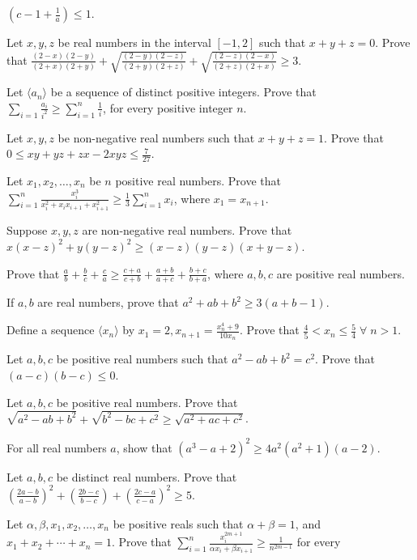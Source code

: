   $\left(c - 1 + \frac{1}{a}\right)\leq 1$.
\item Let $x, y, z$ be real numbers in the interval $[-1, 2]$ such that $x + y + z = 0$. Prove that $\frac{(2 - x)(2 - y)}{(2 +
  x)(2 + y)} + \sqrt{\frac{(2 - y)(2 - z)}{(2 + y)(2 + z)}} + \sqrt{\frac{(2 - z)(2 - x)}{(2 + z)(2 + x)}}\geq 3$.
\item Let $\langle a_n\rangle$ be a sequence of distinct positive integers. Prove that $\displaystyle\sum_{i=1}\frac{a_i}{i^2}\geq
  \sum_{i = 1}^n\frac{1}{i}$, for every positive integer $n$.
\item Let $x, y, z$ be non-negative real numbers such that $x + y + z = 1$. Prove that $0\leq xy + yz + zx - 2xyz\leq
  \frac{7}{27}$.
\item Let $x_1, x_2, \ldots, x_n$ be $n$ positive real numbers. Prove that $\displaystyle\sum_{i=1}^n\frac{x_i^3}{x_i^2 + x_ix_{i +
    1} + x_{i + 1}^2}\geq \frac{1}{3}\sum_{i=1}^nx_i$, where $x_1 = x_{n + 1}$.
\item Suppose $x, y, z$ are non-negative real numbers. Prove that $x(x - z)^2 + y(y - z)^2\geq (x - z)(y - z)(x + y - z)$.
\item Prove that $\frac{a}{b} + \frac{b}{c} + \frac{c}{a}\geq \frac{c + a}{c + b} + \frac{a + b}{a + c} + \frac{b + c}{b + a}$,
  where $a, b, c$ are positive real numbers.
\item If $a, b$ are real numbers, prove that $a^2 + ab + b^2\geq 3(a + b - 1)$.
\item Define a sequence $\langle x_n\rangle$ by $x_1 = 2, x_{n + 1} = \frac{x_n^4 + 9}{10x_n}$. Prove that $\frac{4}{5}< x_n \leq
  \frac{5}{4}\;\forall\;n > 1$.
\item Let $a, b, c$ be positive real numbers such that $a^2 - ab + b^2 = c^2$. Prove that $(a - c)(b - c)\leq 0$.
\item Let $a, b, c$ be positive real numbers. Prove that $\sqrt{a^2 - ab + b^2} + \sqrt{b^2 - bc + c^2}\geq \sqrt{a^2 + ac + c^2}$.
\item For all real numbers $a$, show that $(a^3 - a + 2)^2 \geq 4a^2(a^2 + 1)(a - 2)$.
\item Let $a, b, c$ be distinct real numbers. Prove that $\left(\frac{2a - b}{a - b}\right)^2 + \left(\frac{2b - c}{b -c}\right) +
  \left(\frac{2c - a}{c - a}\right)^2\geq 5$.
\item Let $\alpha, \beta, x_1, x_2, \ldots, x_n$ be positive reals such that $\alpha + \beta = 1$, and $x_1 + x_2 + \cdots + x_n =
  1$. Prove that $\displaystyle\sum_{i=1}^n\frac{x_i^{2m + 1}}{\alpha x_i + \beta x_{i + 1}}\geq \frac{1}{n^{2m - 1}}$ for every
